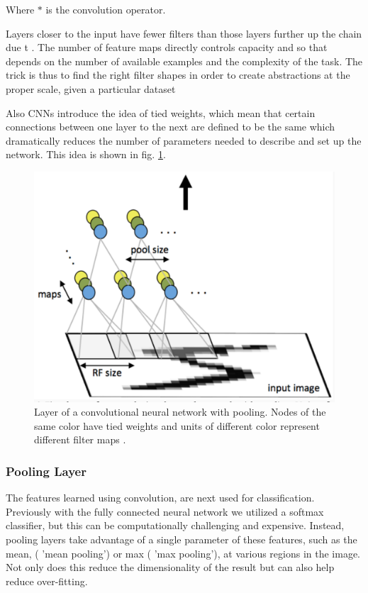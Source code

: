 \documentclass[12pt, twocolumn]{article}
\begin{document}
 Where $\ast$ is the convolution operator. 
 
 Layers closer to the input have fewer filters than those layers further up the chain due t . The number of feature maps directly controls capacity and so that depends on the number of available examples and the complexity of the task. The trick is thus to find the right filter shapes in order to create abstractions at the proper scale, given a particular dataset

Also CNNs introduce the idea of tied weights, which mean that certain connections between one layer to the next are defined to be the same which dramatically reduces the number of parameters needed to describe and set up the network. This idea is shown in fig. \ref{fig:conv}.



\begin{figure}
\includegraphics[scale=.4]{convgraphic.png}

\caption{Layer of a convolutional neural network with pooling. Nodes of the same color have tied weights and units of different color represent different filter maps \cite{StanfordTut}. }
\label{fig:conv}
\end{figure}


\subsubsection{Pooling Layer}
The features learned using convolution, are next used for classification. Previously with the fully connected neural network we utilized a softmax classifier, but this can be computationally challenging and expensive. Instead, pooling layers take advantage of a single parameter of these features, such as the mean, ( 'mean pooling') or max ( 'max pooling'), at  various regions in the image. Not only does this reduce the dimensionality of the result but can also help reduce over-fitting.
\end{document}
